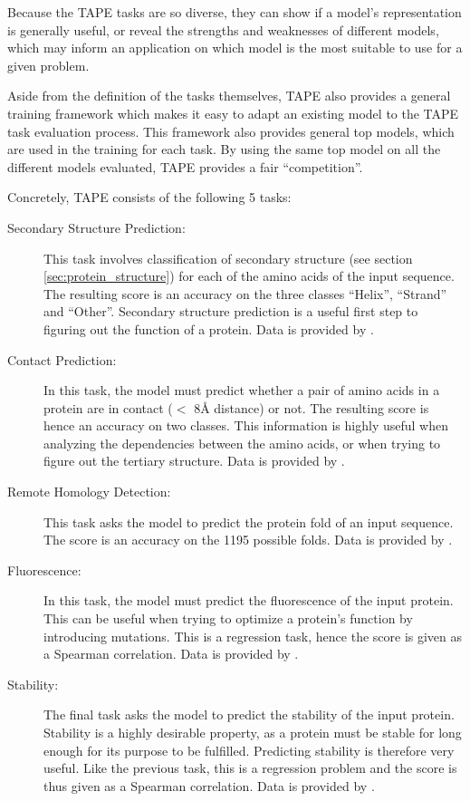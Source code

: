 Because the TAPE tasks are so diverse, they can show if a model's representation is generally useful, or reveal the strengths and weaknesses of different models, which may inform an application on which model is the most suitable to use for a given problem.

Aside from the definition of the tasks themselves, TAPE also provides a general training framework which makes it easy to adapt an existing model to the TAPE task evaluation process. This framework also provides general top models, which are used in the training for each task. By using the same top model on all the different models evaluated, TAPE provides a fair ``competition''.

Concretely, TAPE consists of the following 5 tasks:
\begin{description}
    \item[Secondary Structure Prediction:] This task involves classification of secondary structure (see section \ref{sec:protein_structure}) for each of the amino acids of the input sequence. The resulting score is an accuracy on the three classes ``Helix'', ``Strand'' and ``Other''. Secondary structure prediction is a useful first step to figuring out the function of a protein. Data is provided by \cite{pdb, casp, netsurfp}.
    \item[Contact Prediction:] In this task, the model must predict whether a pair of amino acids in a protein are in contact ($<$ 8Å distance) or not. The resulting score is hence an accuracy on two classes. This information is highly useful when analyzing the dependencies between the amino acids, or when trying to figure out the tertiary structure. Data is provided by \cite{scop, casp, proteinnet, pdb}.
    \item[Remote Homology Detection:] This task asks the model to predict the protein fold of an input sequence. The score is an accuracy on the 1195 possible folds. Data is provided by \cite{scop}.
    \item[Fluorescence:] In this task, the model must predict the fluorescence of the input protein. This can be useful when trying to optimize a protein's function by introducing mutations. This is a regression task, hence the score is given as a Spearman correlation. Data is provided by \cite{sarkisyan2016}.
    \item[Stability:] The final task asks the model to predict the stability of the input protein. Stability is a highly desirable property, as a protein must be stable for long enough for its purpose to be fulfilled. Predicting stability is therefore very useful. Like the previous task, this is a regression problem and the score is thus given as a Spearman correlation. Data is provided by \cite{rocklin2017}.
\end{description}


